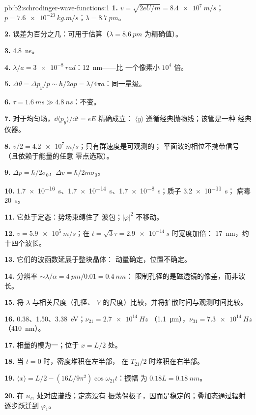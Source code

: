 \begin{solution}{pb:b2:schrodinger-wave-functions:1}
\textbf{1.} $v = \sqrt{2eU/m} = \qty{8.4e7}{m/s}$；$p = \qty{7.6e-23}{kg.m/s}$；$\lambda =
\qty{8.7}{pm}$。

\textbf{2.} 误差为百分之几：可用于估算（$\lambda =
\qty{8.6}{pm}$ 为精确值）。

\textbf{3.} \qty{4.8}{ns}。

\textbf{4.} $\lambda/a = \qty{3e-8}{rad}$：\qty{12}{nm}——比
一个像素小 $10^4$ 倍。

\textbf{5.} $\Delta\theta = \Delta p_y/p \sim \hbar/2ap = \lambda/4\pi a$：同一量级。

\textbf{6.} $\tau = \qty{1.6}{ms} \gg \qty{4.8}{ns}$：不变。

\textbf{7.} 对于均匀场，$\dd\langle p_y\rangle/\dd t = eE$ 精确成立：
$\langle y\rangle$ 遵循经典抛物线；该管是一种
经典仪器。

\textbf{8.} $v/2 = \qty{4.2e7}{m/s}$；只有群速度是可观测的；
平面波的相位不携带信号（且依赖于能量的任意
零点选取）。

\textbf{9.} $\Delta p = \hbar/2\sigma_0$，$\Delta v = \hbar/2m\sigma_0$。

\textbf{10.} \qty{1.7e-16}{s}、\qty{1.7e-14}{s}、\qty{1.7e-8}{s}；质子 \qty{3.2e-11}{s}；
病毒 \qty{20}{s}。

\textbf{11.} 它处于定态：势场束缚住了
波包；$|\varphi|^2$ 不移动。

\textbf{12.} $v = \qty{5.9e5}{m/s}$；在 $t = \sqrt3\tau = \qty{2.9e-14}{s}$ 时宽度加倍：
\qty{17}{nm}，约十四个波长。

\textbf{13.} 它们的波函数延展于整块晶体：
动量确定，位置不确定。

\textbf{14.} 分辨率 $\sim\lambda/\alpha = \qty{4}{pm}/0.01 = \qty{0.4}{nm}$：
限制孔径的是磁透镜的像差，而非波长。

\textbf{15.} 将 $\lambda$ 与相关尺度（孔径、
$V$ 的尺度）比较，并将扩散时间与观测时间比较。

\textbf{16.} \qty{0.38}{}、\qty{1.50}{}、\qty{3.38}{eV}；$\nu_{21} = \qty{2.7e14}{Hz}$
（\qty{1.1}{\micro m}），$\nu_{31} = \qty{7.3e14}{Hz}$（\qty{410}{nm}）。

\textbf{17.} 相量的模为一；位于 $x = L/2$ 处。

\textbf{18.} 当 $t = 0$ 时，密度堆积在左半部，
在 $T_{21}/2$ 时堆积在右半部。

\textbf{19.} $\langle x\rangle = L/2 - (16L/9\pi^2)\cos\omega_{21}t$：振幅
为 $0.18L = \qty{0.18}{nm}$。

\textbf{20.} 在 $\nu_{21}$ 处对应谱线；定态没有
振荡偶极子，因而是稳定的；叠加态通过辐射
逐步跃迁到 $\varphi_1$。


\end{solution}
